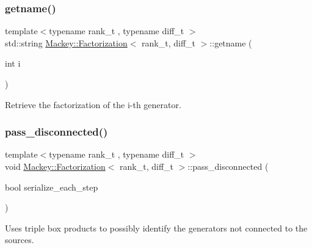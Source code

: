 \subsubsection{\texorpdfstring{getname()}{getname()}}
{\footnotesize\ttfamily template$<$typename rank\+\_\+t , typename diff\+\_\+t $>$ \\
std\+::string \hyperlink{classMackey_1_1Factorization}{Mackey\+::\+Factorization}$<$ rank\+\_\+t, diff\+\_\+t $>$\+::getname (\begin{DoxyParamCaption}\item[{int}]{i }\end{DoxyParamCaption})}



Retrieve the factorization of the i-\/th generator. 

\mbox{\label{classMackey_1_1Factorization_aad2d840b523d193f4c3554e9e3f7fb00}} 
\subsubsection{\texorpdfstring{pass\+\_\+disconnected()}{pass\_disconnected()}}
{\footnotesize\ttfamily template$<$typename rank\+\_\+t , typename diff\+\_\+t $>$ \\
void \hyperlink{classMackey_1_1Factorization}{Mackey\+::\+Factorization}$<$ rank\+\_\+t, diff\+\_\+t $>$\+::pass\+\_\+disconnected (\begin{DoxyParamCaption}\item[{bool}]{serialize\+\_\+each\+\_\+step }\end{DoxyParamCaption})}



Uses triple box products to possibly identify the generators not connected to the sources. 

